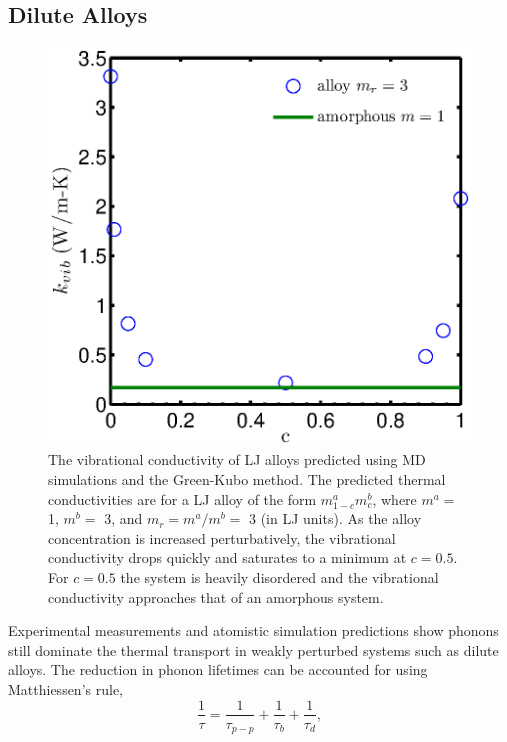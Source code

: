 \documentclass[letterpaper,12pt]{article}
\begin{document}
\subsection{\label{S-Prelim-Dilute-Alloys}Dilute Alloys}
\begin{figure}
\begin{center}
\includegraphics[scale=0.6]{LJ_alloy_GK.eps}
\vspace*{-5mm}
\end{center}
\caption{\label{FIG:LJ_alloy_GK} The vibrational conductivity of LJ alloys predicted using MD simulations and the Green-Kubo method. The predicted thermal conductivities are for a LJ alloy of the form $m^a_{1-c}m^b_{c}$, where $m^a =$ 1, $m^b=$ 3, and $m_r = m^a/m^b=$ 3 (in LJ units). As the alloy concentration is increased perturbatively, the vibrational conductivity drops quickly and saturates to a minimum at $c=0.5$. For $c=0.5$ the system is heavily disordered and the vibrational conductivity approaches that of an amorphous system.}
\end{figure}
Experimental measurements\cite{PhysRevB.71.235202} and atomistic simulation predictions\cite{shiomi2011a} show phonons still dominate the thermal transport in weakly perturbed systems such as dilute alloys.\cite{callaway1959} The reduction in phonon lifetimes can be accounted for using Matthiessen's rule,
\begin{equation}\label{EQ:M:tau_matthiessen}
\frac{1}{\tau} = \frac{1}{\tau_{p-p}} + \frac{1}{\tau_{b}} + \frac{1}{\tau_{d}},
\end{equation}
\end{document}
